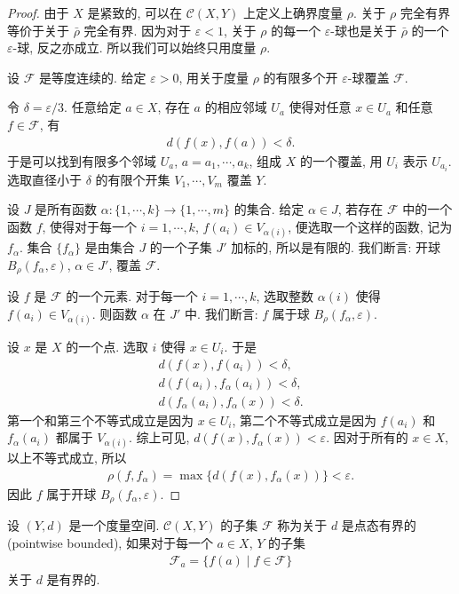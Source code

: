 \documentclass[../../main.tex]{subfiles}
\begin{document}
\begin{proof}
由于 $X$ 是紧致的, 可以在 $\mathcal{C}(X,Y)$ 上定义上确界度量 $\rho$. 关于 $\rho$ 完全有界等价于关于 $\bar{\rho}$ 完全有界. 因为对于 $\varepsilon<1$, 关于 $\rho$ 的每一个 $\varepsilon$-球也是关于 $\bar{\rho}$ 的一个 $\varepsilon$-球, 反之亦成立. 所以我们可以始终只用度量 $\rho$.

设 $\mathcal{F}$ 是等度连续的. 给定 $\varepsilon>0$, 用关于度量 $\rho$ 的有限多个开 $\varepsilon$-球覆盖 $\mathcal{F}$.

令 $\delta=\varepsilon/3$. 任意给定 $a\in X$, 存在 $a$ 的相应邻域 $U_a$ 使得对任意 $x\in U_a$ 和任意 $f\in\mathcal{F}$, 有
\begin{align*}
d(f(x),f(a))<\delta.
\end{align*}
于是可以找到有限多个邻域 $U_a$, $a=a_1,\cdots,a_k$, 组成 $X$ 的一个覆盖, 用 $U_i$ 表示 $U_{a_i}$. 选取直径小于 $\delta$ 的有限个开集 $V_1,\cdots,V_m$ 覆盖 $Y$.

设 $J$ 是所有函数 $\alpha\colon\{1,\cdots,k\}\to\{1,\cdots,m\}$ 的集合. 给定 $\alpha\in J$, 若存在 $\mathcal{F}$ 中的一个函数 $f$, 使得对于每一个 $i=1,\cdots,k$, $f(a_i)\in V_{\alpha(i)}$, 便选取一个这样的函数, 记为 $f_\alpha$. 集合 $\{f_\alpha\}$ 是由集合 $J$ 的一个子集 $J'$ 加标的, 所以是有限的. 我们断言: 开球 $B_\rho(f_\alpha,\varepsilon)$, $\alpha\in J'$, 覆盖 $\mathcal{F}$.

设 $f$ 是 $\mathcal{F}$ 的一个元素. 对于每一个 $i=1,\cdots,k$, 选取整数 $\alpha(i)$ 使得 $f(a_i)\in V_{\alpha(i)}$. 则函数 $\alpha$ 在 $J'$ 中. 我们断言: $f$ 属于球 $B_\rho(f_\alpha,\varepsilon)$.

设 $x$ 是 $X$ 的一个点. 选取 $i$ 使得 $x\in U_i$. 于是
\begin{align*}
d(f(x),f(a_i))<\delta,\\
d(f(a_i),f_\alpha(a_i))<\delta,\\
d(f_\alpha(a_i),f_\alpha(x))<\delta.
\end{align*}
第一个和第三个不等式成立是因为 $x\in U_i$, 第二个不等式成立是因为 $f(a_i)$ 和 $f_\alpha(a_i)$ 都属于 $V_{\alpha(i)}$. 综上可见, $d(f(x),f_\alpha(x))<\varepsilon$. 因对于所有的 $x\in X$, 以上不等式成立, 所以
\begin{align*}
\rho(f,f_\alpha)=\max\{d(f(x),f_\alpha(x))\}<\varepsilon.
\end{align*}
因此 $f$ 属于开球 $B_\rho(f_\alpha,\varepsilon)$.
\end{proof}

\begin{definition}\label{definition:ch07-pointwise-bounded}
设 $(Y,d)$ 是一个度量空间. $\mathcal{C}(X,Y)$ 的子集 $\mathcal{F}$ 称为关于 $d$ 是点态有界的(pointwise bounded), 如果对于每一个 $a\in X$, $Y$ 的子集
\begin{align*}
\mathcal{F}_a=\{f(a)\mid f\in\mathcal{F}\}
\end{align*}
关于 $d$ 是有界的.
\end{definition}
\end{document}
